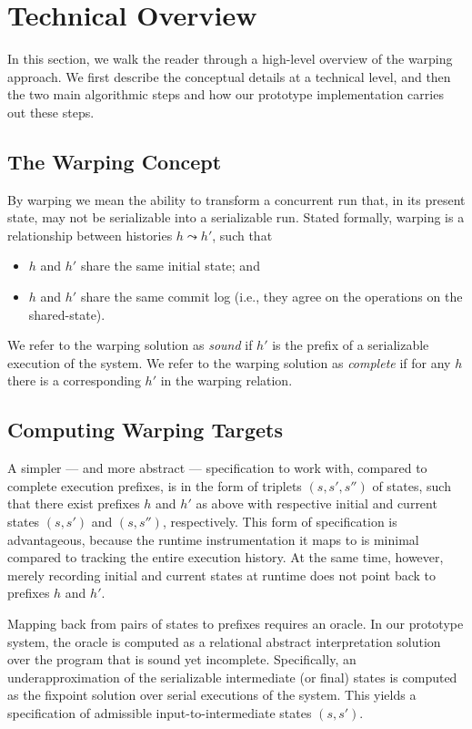 \section{Technical Overview}

In this section, we walk the reader through a high-level overview of the warping approach. We first describe the conceptual details at a technical level, and then the two main algorithmic steps and how our prototype implementation carries out these steps.

\subsection{The Warping Concept}

By warping we mean the ability to transform a concurrent run that, in its present state, may not be serializable into a serializable run. Stated formally, warping is a relationship between histories $h \leadsto h'$, such that
\begin{itemize}
	\item $h$ and $h'$ share the same initial state; and
	\item $h$ and $h'$ share the same commit log (i.e., they agree on the operations on the shared-state).
\end{itemize} 

We refer to the warping solution as \emph{sound} if $h'$ is the prefix of a serializable execution of the system. We refer to the warping solution as \emph{complete} if for any $h$ there is a corresponding $h'$ in the warping relation.

\subsection{Computing Warping Targets}

A simpler --- and more abstract --- specification to work with, compared to complete execution prefixes, is in the form of triplets $(s,s',s'')$ of states, such that there exist prefixes $h$ and $h'$ as above with respective initial and current states $(s,s')$ and $(s,s'')$, respectively. This form of specification is advantageous, because the runtime instrumentation it maps to is minimal compared to tracking the entire execution history. At the same time, however, merely recording initial and current states at runtime does not point back to prefixes $h$ and $h'$.

Mapping back from pairs of states to prefixes requires an oracle. In our prototype system, the oracle is computed as a relational abstract interpretation solution over the program that is sound yet incomplete. Specifically, an underapproximation of the serializable intermediate (or final) states is computed as the fixpoint solution over serial executions of the system. This yields a specification of admissible input-to-intermediate states $(s,s')$.

